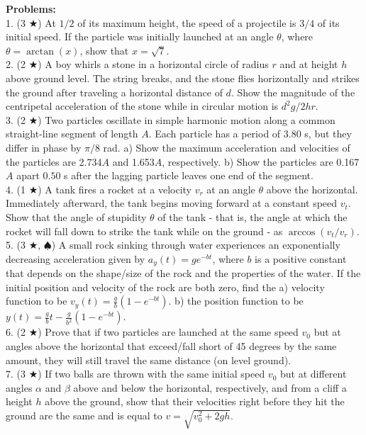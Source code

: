 \noindent \textbf{Problems:}\\
1. (3 $\bigstar$) At $1/2$ of its maximum height, the speed of a projectile is $3/4$ of its initial speed. If the particle was initially launched at an angle $\theta$, where $\theta = \arctan(x)$, show that $x = \sqrt{7}$.\\
2. (2 $\bigstar$) A boy whirls a stone in a horizontal circle of radius $r$ and at height $h$ above ground level. The string breaks, and the stone flies horizontally and strikes the ground after traveling a horizontal distance of $d$. Show the magnitude of the centripetal acceleration of the stone while in circular motion is $d^2g/2hr$. \\
3. (2 $\bigstar$) Two particles oscillate in simple harmonic motion along a common straight-line segment of length $A$. Each particle has a period of 3.80 s, but they differ in phase by $\pi/8$ rad. a) Show the maximum acceleration and velocities of the particles are 2.734$A$ and 1.653$A$, respectively. b) Show the particles are 0.167$A$ apart $0.50$ s after the lagging particle leaves one end of the segment.\\
4. (1 $\bigstar$) A tank fires a rocket at a velocity $v_r$ at an angle $\theta$ above the horizontal. Immediately afterward, the tank begins moving forward at a constant speed $v_t$. Show that the angle of stupidity $\theta$ of the tank - that is, the angle at which the rocket will fall down to strike the tank while on the ground - as $\arccos(v_t/v_r)$. \\
5. (3 $\bigstar$, $\spadesuit$) A small rock sinking through water experiences an exponentially decreasing acceleration given by $a_y(t) = ge^{-bt}$, where $b$ is a positive constant that depends on the shape/size of the rock and the properties of the water. If the initial position and velocity of the rock are both zero, find the a) velocity function to be $v_y(t) = \frac{g}{b} (1-e^{-bt})$. b) the position function to be $y(t) = \frac{g}{b}t - \frac{g}{b^2}(1-e^{-bt})$.\\
6. (2 $\bigstar$) Prove that if two particles are launched at the same speed $v_0$ but at angles above the horizontal that exceed/fall short of 45 degrees by the same amount, they will still travel the same distance (on level ground).\\
7. (3 $\bigstar$) If two balls are thrown with the same initial speed $v_0$ but at different angles $\alpha$ and $\beta$ above and below the horizontal, respectively, and from a cliff a height $h$ above the ground, show that their velocities right before they hit the ground are the same and is equal to $v = \sqrt{v_0^2+2gh}$.\\

\pagebreak